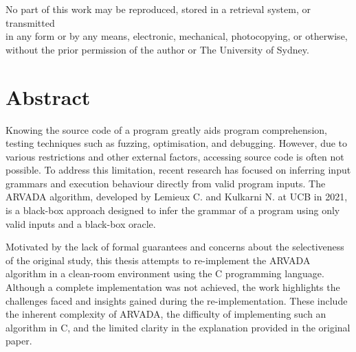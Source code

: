 \onehalfspacing

\restoregeometry
\onehalfspacing

\clearpage\null\thispagestyle{empty}
\begin{center}
    \vspace*{\fill}
    
    
    No part of this work may be reproduced, stored in a retrieval system, or transmitted \\
    in any form or by any means, electronic, mechanical, photocopying, or otherwise, \\
    without the prior permission of the author or The University of Sydney.
\end{center}

\chapter*{Abstract}
Knowing the source code of a program greatly aids program comprehension, testing techniques such as fuzzing, optimisation, and debugging. However, due to various restrictions and other external factors, accessing source code is often not possible. To address this limitation, recent research has focused on inferring input grammars and execution behaviour directly from valid program inputs. The ARVADA algorithm, developed by Lemieux C. and Kulkarni N. at UCB in 2021, is a black-box approach designed to infer the grammar of a program using only valid inputs and a black-box oracle.

Motivated by the lack of formal guarantees and concerns about the selectiveness of the original study, this thesis attempts to re-implement the ARVADA algorithm in a clean-room environment using the C programming language. Although a complete implementation was not achieved, the work highlights the challenges faced and insights gained during the re-implementation. These include the inherent complexity of ARVADA, the difficulty of implementing such an algorithm in C, and the limited clarity in the explanation provided in the original paper.


\newpage\thispagestyle{empty}
\tableofcontents
\listoffigures


